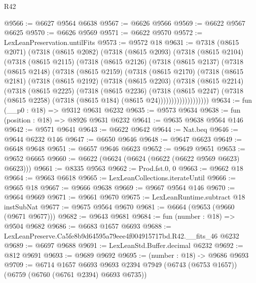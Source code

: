 \begin{lexlean}{R42}
\begin{coremodule}
{@9566 := @6627 @9564 @6638
@9567 := @6626 @9566
@9569 := @6622 @9567 @6625
@9570 := @6626 @9569
@9571 := @6622 @9570
@9572 := LexLeanPreservation.untilFits
@9573 := @9572 @18
@9631 := @7318
    (@8615 @2071)
    (@7318
      (@8615 @2082)
      (@7318
        (@8615 @2093)
        (@7318
          (@8615 @2104)
          (@7318
            (@8615 @2115)
            (@7318
              (@8615 @2126)
              (@7318
                (@8615 @2137)
                (@7318
                  (@8615 @2148)
                  (@7318
                    (@8615 @2159)
                    (@7318
                      (@8615 @2170)
                      (@7318
                        (@8615 @2181)
                        (@7318
                          (@8615 @2192)
                          (@7318
                            (@8615 @2203)
                            (@7318
                              (@8615 @2214)
                              (@7318
                                (@8615 @2225)
                                (@7318
                                  (@8615 @2236)
                                  (@7318
                                    (@8615 @2247)
                                    (@7318
                                      (@8615 @2258)
                                      (@7318 (@8615 @184) (@8615 @24)))))))))))))))))))
@9634 := fun (__p0 : @18) => @9312 @9631 @6232
@9635 := @9573 @9634
@9638 := fun (position : @18) => @8926 @9631 @6232
@9641 := @9635 @9638 @9564 @146
@9642 := @9571 @9641
@9643 := @6622 @9642
@9644 := Nat.beq
@9646 := @9644 @6232 @146
@9647 := @6650 @9646
@9648 := @9647 @6623
@9649 := @6648 @9648
@9651 := @6657 @9646 @6623
@9652 := @9649 @9651
@9653 := @9652 @6665
@9660 := @6622 (@6624 (@6624 (@6622 (@6622 @9569 @6623) @6623)))
@9661 := @8335 @9563
@9662 := Prod.fst.{0, 0}
@9663 := @9662 @18
@9664 := @9663 @6618
@9665 := LexLeanCollections.iterateUntil
@9666 := @9665 @18
@9667 := @9666 @9638
@9669 := @9667 @9564 @146
@9670 := @9664 @9669
@9671 := @9661 @9670
@9675 := LexLeanRuntime.subtract @18 instSubNat
@9677 := @9675 @9564 @9670
@9681 := @6664 (@9653 (@9660 (@9671 @9677)))
@9682 := @9643 @9681
@9684 := fun (number : @18) => @9504 @9682
@9686 := @6683 @1657 @6693
@9688 := LexLeanPreserve.Ca5fe8b9d64595a79eee4f004915717bd.R42.__fits_46 @6232
@9689 := @6697 @9688
@9691 := LexLeanStd.Buffer.decimal @6232
@9692 := @812 @9691
@9693 := @9689 @9692
@9695 := (number : @18) -> @9686 @9693
@9709 := @6714
    @1657
    @6693
    @9693
    @2394
    @7949
    (@6743 (@6753 @1657))
    (@6759 (@6760 (@6761 @2394) @6693 @6735))
}
\end{coremodule}
\end{lexlean}
